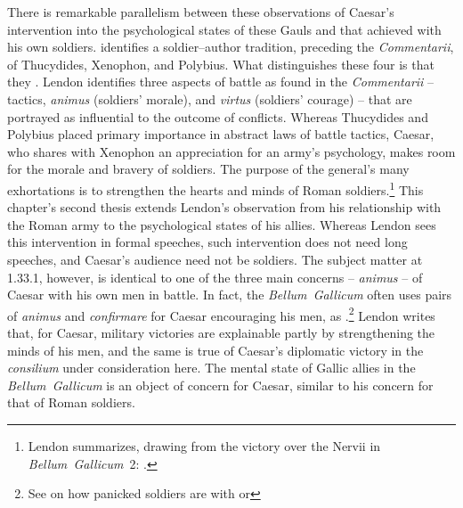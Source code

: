 \documentclass[12pt,letterpaper,oneside,final]{memoir}
\begin{document}
There is remarkable parallelism between these observations of Caesar's intervention into the psychological states of these Gauls and that achieved with his own soldiers. \textcite{lendon1999}\label{lendon-sum} identifies a soldier--author tradition, preceding the \emph{Commentarii}, of Thucydides, Xenophon, and Polybius. What distinguishes these four is that they . Lendon identifies three aspects of battle as found in the \emph{Commentarii} -- tactics, \emph{animus} (soldiers' morale), and \emph{virtus} (soldiers' courage) -- that are portrayed as influential to the outcome of conflicts. Whereas Thucydides and Polybius placed primary importance in abstract laws of battle tactics, Caesar, who shares with Xenophon an appreciation for an army's psychology, makes room for the morale and bravery of soldiers. The purpose of the general's many exhortations is to strengthen the hearts and minds of Roman soldiers.\footnote{Lendon summarizes, drawing from the victory over the Nervii in \emph{Bellum~Gallicum}~2: .} This chapter's second thesis extends Lendon's observation from his relationship with the Roman army to the psychological states of his allies. Whereas Lendon sees this intervention in formal speeches, such intervention does not need long speeches, and Caesar's audience need not be soldiers. The subject matter at 1.33.1, however, is identical to one of the three main concerns -- \emph{animus} -- of Caesar with his own men in battle. In fact, the \emph{Bellum~Gallicum} often uses pairs of \emph{animus} and \emph{confirmare} for Caesar encouraging his men, as .\footnote{See \textcite[299--301]{lendon1999} on how panicked soldiers are  with  or } Lendon writes that, for Caesar, military victories are explainable partly by strengthening the minds of his men, and the same is true of Caesar's diplomatic victory in the \emph{consilium} under consideration here. The mental state of Gallic allies in the \emph{Bellum~Gallicum} is an object of concern for Caesar, similar to his concern for that of Roman soldiers. 
\end{document}
